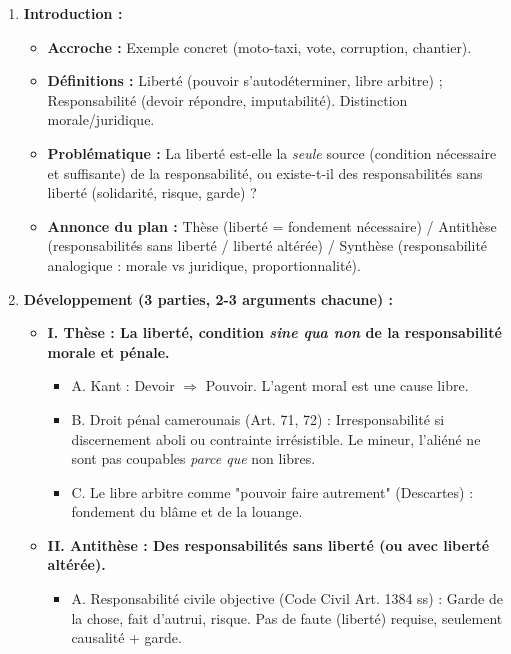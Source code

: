 \documentclass[11pt]{article}
\begin{document}
\begin{methode}
\begin{enumerate}
    \item \textbf{Introduction :}
        \begin{itemize}
            \item \textbf{Accroche :} Exemple concret (moto-taxi, vote, corruption, chantier).
            \item \textbf{Définitions :} Liberté (pouvoir s'autodéterminer, libre arbitre) ; Responsabilité (devoir répondre, imputabilité). Distinction morale/juridique.
            \item \textbf{Problématique :} La liberté est-elle la \emph{seule} source (condition nécessaire et suffisante) de la responsabilité, ou existe-t-il des responsabilités sans liberté (solidarité, risque, garde) ?
            \item \textbf{Annonce du plan :} Thèse (liberté = fondement nécessaire) / Antithèse (responsabilités sans liberté / liberté altérée) / Synthèse (responsabilité analogique : morale vs juridique, proportionnalité).
        \end{itemize}
    \item \textbf{Développement (3 parties, 2-3 arguments chacune) :}
        \begin{itemize}
            \item \textbf{I. Thèse : La liberté, condition \emph{sine qua non} de la responsabilité morale et pénale.}
                \begin{itemize}
                    \item A. Kant : Devoir $\Rightarrow$ Pouvoir. L'agent moral est une cause libre.
                    \item B. Droit pénal camerounais (Art. 71, 72) : Irresponsabilité si discernement aboli ou contrainte irrésistible. Le mineur, l'aliéné ne sont pas coupables \emph{parce que} non libres.
                    \item C. Le libre arbitre comme "pouvoir faire autrement" (Descartes) : fondement du blâme et de la louange.
                \end{itemize}
            \item \textbf{II. Antithèse : Des responsabilités sans liberté (ou avec liberté altérée).}
                \begin{itemize}
                    \item A. Responsabilité civile objective (Code Civil Art. 1384 ss) : Garde de la chose, fait d'autrui, risque. Pas de faute (liberté) requise, seulement causalité + garde.

\end{itemize}
\end{itemize}
\end{enumerate}
\end{methode}
\end{document}

